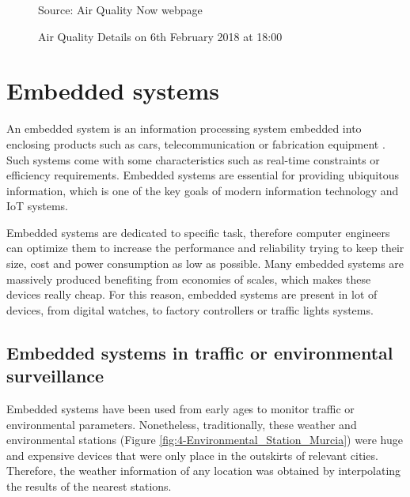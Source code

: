 \begin{figure}[htb]
	\centering
	\caption{Air Quality Details on 6th February 2018 at 18:00}
	\label{fig:4-AirQuality-Details}{Source: Air Quality Now webpage \cite{airqualitynow}}
\end{figure}



\section{Embedded systems}
An embedded system is an information processing system embedded into enclosing products such as cars, telecommunication or fabrication equipment \cite{Mar16}. Such systems come with some characteristics such as real-time constraints or efficiency requirements. Embedded systems are essential for providing ubiquitous information, which is one of the key goals of modern information technology and \ac{IoT} systems.

Embedded systems are dedicated to specific task, therefore computer engineers can optimize them to increase the performance and reliability trying to keep their size, cost and power consumption as low as possible. Many embedded systems are massively produced benefiting from economies of scales, which makes these devices really cheap. For this reason, embedded systems are present in lot of devices, from digital watches, to factory controllers or traffic lights systems. 

\subsection{Embedded systems in traffic or environmental surveillance}
Embedded systems have been used from early ages to monitor traffic or environmental parameters. Nonetheless, traditionally, these weather and environmental stations (Figure \ref{fig:4-Environmental_Station_Murcia}) were huge and expensive devices that were only place in the outskirts of relevant cities. Therefore, the weather information of any location was obtained by interpolating the results of the nearest stations.

